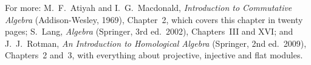 For more: M.~F.~Atiyah and I.~G.~Macdonald, \emph{Introduction to Commutative Algebra} (Addison-Wesley, 1969), Chapter~2, which covers this chapter in twenty pages; S.~Lang, \emph{Algebra} (Springer, 3rd ed.\ 2002),
Chapters~III and XVI; and J.~J.~Rotman, \emph{An Introduction to Homological Algebra} (Springer, 2nd ed.\ 2009), Chapters~2 and~3, with everything about projective, injective and flat modules.
